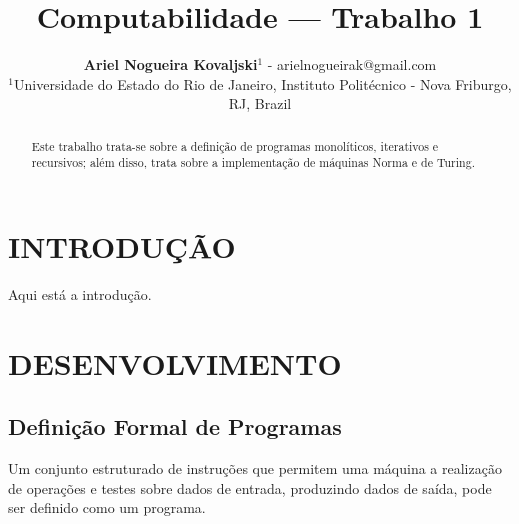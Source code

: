 \documentclass[12pt,fleqn]{article}
\title{Computabilidade --- Trabalho 1}
\author
    {\rm \begin{tabular}{l}
    \textbf{Ariel Nogueira Kovaljski}$^{1}$ - {\textnormal
    arielnogueirak@gmail.com}\\%
    {\fontsize{11}{0}\selectfont $^{1}$Universidade do Estado do Rio de
    Janeiro, Instituto Politécnico - Nova Friburgo, RJ,
    Brazil}\vspace*{-0.05cm} \\
  \end{tabular}}
\renewcommand{\headrulewidth}{0.0pt}
\begin{document}
%

\vspace{-3cm}

\maketitle


\pagestyle{empty}

\thispagestyle{firspagetstyle}

\begin{abstract}
    Este trabalho trata-se sobre a definição de programas monolíticos,
    iterativos e recursivos; além disso, trata sobre a implementação de máquinas
    Norma e de Turing.
\end{abstract}



\fancyhead[L]{\footnotesize{\fontsize{7.5}{0}\selectfont \it}}

\renewcommand{\headrulewidth}{0.0pt}
\fancyfoot[C]{\footnotesize \parbox{15cm} {\centering
\fontsize{7.5}{0}\selectfont \it  }} %
\rhead{}


\pagestyle{fancy}


\section{INTRODUÇÃO}
Aqui está a introdução.

\section{DESENVOLVIMENTO}

\subsection{Definição Formal de Programas}
Um conjunto estruturado de instruções que permitem uma máquina a realização
de operações e testes sobre dados de entrada, produzindo dados de saída, pode
ser definido como um programa.
\end{document}

